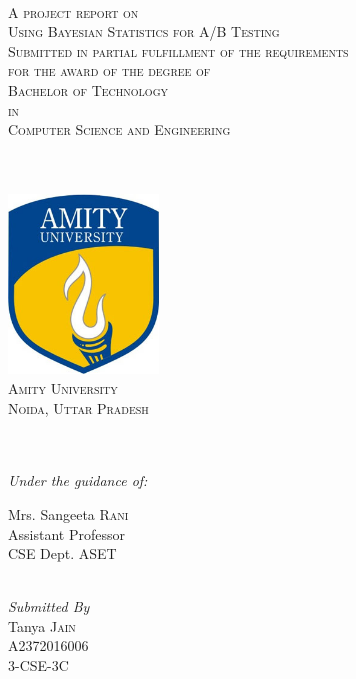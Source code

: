 \begin{titlepage}
  
  \begin{center}
    
    \begin{minipage}{1\textwidth}
      \begin{center}
        \textsc{ }\\[1.5cm]
        \textsc{\Large A project report on} \\ [1.0cm]
        \textsc{\huge Using Bayesian Statistics for A/B Testing}\\[0.7cm]
        \textsc{\small Submitted in partial fulfillment of the requirements \\for the award of the degree of }\\[0.7cm]
        \textsc{\large Bachelor of Technology \\ in \\ Computer Science and Engineering}
      \end{center}
    \end{minipage}

    \textsc{}\\[0.3cm]
    \HRule \\[0.3cm]

    \includegraphics[width=40mm, height=48mm]{./title/Amity-Logo.jpg}\\
    \textsc{\Large Amity University \\ [0.1cm] Noida, Uttar Pradesh} 

    \textsc{}\\
    \HRule \\[0.3cm]


    \emph{Under the guidance of:}\\[0.3cm]
    \begin{minipage}{0.4\textwidth}
      \begin{flushleft}
        Mrs. Sangeeta \textsc{Rani}\\ 
        Assistant Professor\\ CSE Dept. ASET
      \end{flushleft}
    \end{minipage}
    \\[0.4cm]
    \emph{Submitted By}\\
    Tanya \textsc{Jain}\\
    A2372016006\\
    3-CSE-3C
  \end{center}
\end{titlepage}
